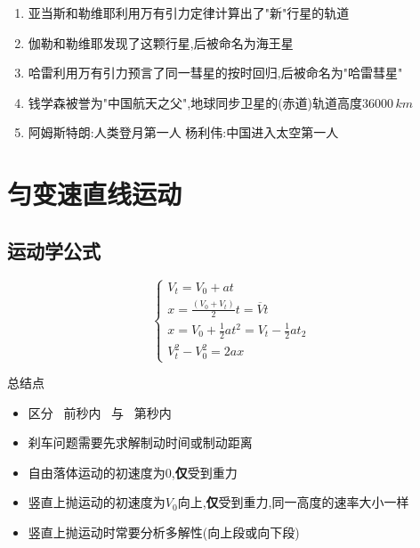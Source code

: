 \documentclass{article}
\begin{document}
\begin{enumerate}
\begin{adjustbox}{minipage=0.86\linewidth, bgcolor=gray!20, padding=1em}
              \vspace{-1em}

              $$ \theta \propto \text{力矩} \quad \lra  \quad k\theta = 2F_{G}L \quad (k\text{为比例系数需提前测量}) $$
          \end{adjustbox}

          \vspace{-1em}

    \item 亚当斯和勒维耶利用万有引力定律计算出了"新"行星的轨道
    \item 伽勒和勒维耶发现了这颗行星,后被命名为海王星
    \item 哈雷利用万有引力预言了同一彗星的按时回归,后被命名为"哈雷彗星"
    \item 钱学森被誉为"中国航天之父",地球同步卫星的(赤道)轨道高度$36000 \,km$
    \item 阿姆斯特朗:人类登月第一人 \quad 杨利伟:中国进入太空第一人
\end{enumerate}

\vspace{2em}

\newpage

\section{匀变速直线运动}

\subsection{运动学公式}
$$
    \begin{cases}
        V_{t} = V_{0} + at                                        \\

        x = \frac{(V_{0} + V_{t})}{2} t = \overline{V} t          \\

        x = V_{0} + \frac{1}{2}at^{2} = V_{t} - \frac{1}{2}at_{2} \\

        V_{t}^{2} - V_{0}^{2} = 2ax
    \end{cases}
$$

总结点

\begin{itemize}
    \item 区分 \, 前秒内 \, 与 \, 第秒内 \,
    \item 刹车问题需要先求解制动时间或制动距离
    \item 自由落体运动的初速度为$0$,\textbf{仅}受到重力
    \item 竖直上抛运动的初速度为$V_{0}$向上,\textbf{仅}受到重力,同一高度的速率大小一样
    \item 竖直上抛运动时常要分析多解性(向上段或向下段)
\end{itemize}
\end{document}
